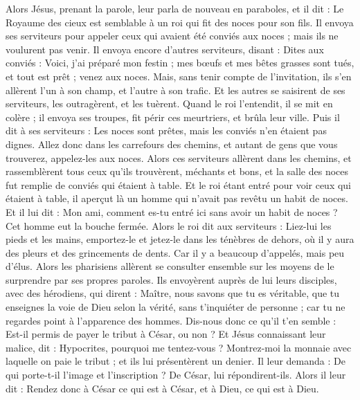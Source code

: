 \begin{multicols}{2}
\VerseOne{}Alors Jésus, prenant la parole, leur parla de nouveau en paraboles, et il dit :
Le Royaume des cieux est semblable à un roi qui fit des noces pour son fils.
Il envoya ses serviteurs pour appeler ceux qui avaient été conviés aux noces ; mais ils ne voulurent pas venir.
Il envoya encore d'autres serviteurs, disant : Dites aux conviés : Voici, j'ai préparé mon festin ; mes bœufs et mes bêtes grasses sont tués, et tout est prêt ; venez aux noces.
Mais, sans tenir compte de l'invitation, ils s'en allèrent l'un à son champ, et l'autre à son trafic.
Et les autres se saisirent de ses serviteurs, les outragèrent, et les tuèrent.
Quand le roi l'entendit, il se mit en colère ; il envoya ses troupes, fit périr ces meurtriers, et brûla leur ville.
Puis il dit à ses serviteurs : Les noces sont prêtes, mais les conviés n'en étaient pas dignes.
Allez donc dans les carrefours des chemins, et autant de gens que vous trouverez, appelez-les aux noces.
Alors ces serviteurs allèrent dans les chemins, et rassemblèrent tous ceux qu'ils trouvèrent, méchants et bons, et la salle des noces fut remplie de conviés qui étaient à table.
Et le roi étant entré pour voir ceux qui étaient à table, il aperçut là un homme qui n'avait pas revêtu un habit de noces.
Et il lui dit : Mon ami, comment es-tu entré ici sans avoir un habit de noces ? Cet homme eut la bouche fermée.
Alors le roi dit aux serviteurs : Liez-lui les pieds et les mains, emportez-le et jetez-le dans les ténèbres de dehors, où il y aura des pleurs et des grincements de dents.
Car il y a beaucoup d'appelés, mais peu d'élus.
Alors les pharisiens allèrent se consulter ensemble sur les moyens de le surprendre par ses propres paroles.
Ils envoyèrent auprès de lui leurs disciples, avec des hérodiens, qui dirent : Maître, nous savons que tu es véritable, que tu enseignes la voie de Dieu selon la vérité, sans t'inquiéter de personne ; car tu ne regardes point à l'apparence des hommes.
Dis-nous donc ce qu'il t'en semble : Est-il permis de payer le tribut à César, ou non ?
Et Jésus connaissant leur malice, dit : Hypocrites, pourquoi me tentez-vous ?
Montrez-moi la monnaie avec laquelle on paie le tribut ; et ils lui présentèrent un denier.
Il leur demanda : De qui porte-t-il l'image et l'inscription ?
De César, lui répondirent-ils. Alors il leur dit : Rendez donc à César ce qui est à César, et à Dieu, ce qui est à Dieu.

\end{multicols}
